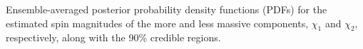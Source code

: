 \label{fig:spinPDF} Ensemble-averaged posterior probability density functions (PDFs) for the estimated spin magnitudes of the more and less massive components, $\chi_1$ and $\chi_2$, respectively, along with the 90\% credible regions.